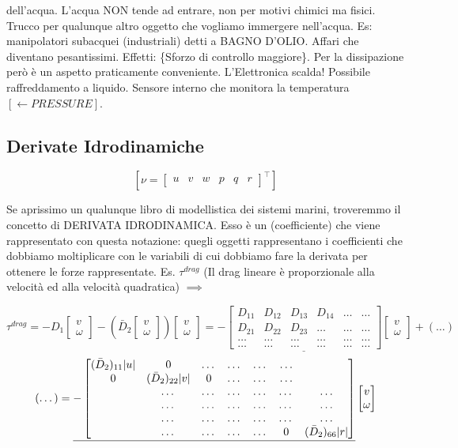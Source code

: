 dell'acqua. L'acqua NON tende ad entrare, non per motivi chimici ma fisici. Trucco per qualunque altro oggetto che vogliamo immergere nell'acqua. Es: manipolatori subacquei (industriali) detti a BAGNO D'OLIO. Affari che diventano pesantissimi. Effetti: \{Sforzo di controllo maggiore\}. Per la dissipazione però è un aspetto praticamente conveniente. L'Elettronica scalda! Possibile raffreddamento a liquido. Sensore interno che monitora la temperatura $[\leftarrow PRESSURE]$.

\subsection{Derivate Idrodinamiche}

\[
	[\nu = \begin{bmatrix}u&v&w&p&q&r\end{bmatrix}^\top]
\]

Se aprissimo un qualunque libro di modellistica dei sistemi marini, troveremmo il concetto di DERIVATA IDRODINAMICA. Esso è un (coefficiente) che viene rappresentato con questa notazione: quegli oggetti rappresentano i coefficienti che dobbiamo moltiplicare con le variabili di cui dobbiamo fare la derivata per ottenere le forze rappresentate. Es. $\tau^{drag}$ (Il drag lineare è proporzionale alla velocità ed alla velocità quadratica) $\implies$

\[
	\tau^{drag} = -D_1\begin{bmatrix}v\\\omega\end{bmatrix} - (\bar{D}_2\begin{bmatrix}v\\\omega\end{bmatrix})\begin{bmatrix}v\\\omega\end{bmatrix} = -\underline{\begin{bmatrix}D_{11}&D_{12}&D_{13}&D_{14}&\dots&\dots\\D_{21}&D_{22}&D_{23}&\dots&\dots&\dots\\\dots&\dots&\dots&\dots&\dots&\dots\\\dots&\dots&\dots&\dots&\dots&\dots\end{bmatrix}}\begin{bmatrix}v\\\omega\end{bmatrix} + (\dots)
\]
\[
	(\dots) = \underline{-\begin{bmatrix}(\bar{D}_2)_{11}\lvert u\rvert&0&\dots&\dots&\dots&\dots\\0&(\bar{D}_2)_{22}\lvert v\rvert&0&\dots&\dots&\dots\\&\dots&\dots&\dots&\dots&\dots&\dots\\&\dots&\dots&\dots&\dots&\dots&\dots\\&\dots&\dots&\dots&\dots&\dots&\dots\\&\dots&\dots&\dots&\dots&0&(\bar{D}_2)_{66}\lvert r\rvert\end{bmatrix}}\begin{bmatrix}v\\\omega\end{bmatrix}
\]

